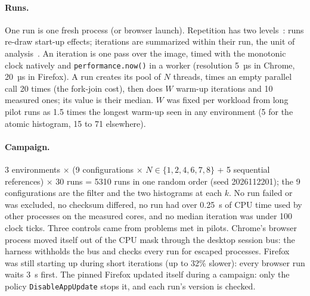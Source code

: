 \documentclass[sigplan]{acmart}
\begin{document}
\paragraph{Runs.} One run is one fresh process (or browser launch).
Repetition has two levels~\cite{kalibera2013}: runs re-draw start-up
effects; iterations are summarized within their run,
the unit of analysis~\cite{georges2007}. An iteration is one pass over the
image, timed with the monotonic clock natively and
\texttt{performance.now()} in a worker (resolution 5~µs in Chrome, 20~µs in
Firefox). A run creates its pool of $N$ threads, times an empty parallel
call 20 times (the fork-join cost), then does $W$ warm-up iterations and 10
measured ones; its value is their median. $W$ was fixed per workload from
long pilot runs as 1.5 times the longest warm-up seen in any environment (5
for the atomic histogram, 15 to 71 elsewhere).

\paragraph{Campaign.} 3 environments $\times$ (9 configurations $\times$
$N \in \{1,2,4,6,7,8\}$ + 5 sequential references) $\times$ 30 runs = 5310
runs in one random order (seed 2026112201); the 9 configurations are the
filter and the two histograms at each $k$. No run failed or was excluded,
no checksum differed, no run had over 0.25~s of CPU time used by other
processes on the measured cores, and no median iteration was under 100
clock ticks. Three controls came from problems met in pilots. Chrome's
browser process moved itself out of the CPU mask through the desktop
session bus: the harness withholds the bus and checks every run for escaped
processes. Firefox was still starting up during short iterations (up to
32\% slower): every browser run waits 3~s first. The pinned Firefox updated
itself during a campaign: only the policy \texttt{DisableAppUpdate} stops
it, and each run's version is checked.
\end{document}
